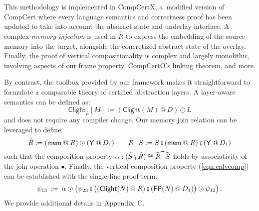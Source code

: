 \documentclass[acmsmall,screen,review,anonymous,nonacm]{acmart}
\newcommand{\kw}[1]{\ensuremath{ \mathsf{#1} }}
\newcommand{\jr}{\mathsf{Y}}
\newcommand{\vcomp}{\fatsemi}
\begin{document}
This methodology is implemented in CompCertX,
a~modified version of CompCert where
every language semantics and correctness proof
has been updated
to take into account the abstract state and underlay interface.
A complex \emph{memory injection} is used in $\hat{R}$
to express the embedding of the source memory into the target,
alongside the concretized abstract state of the overlay.
Finally, the proof of vertical compositionality
is complex and largely monolithic,
involving aspects of
our frame property,
CompCertO's linking theorem, and more.

By contrast,
the toolbox provided by our framework
makes it straightforward to formulate a comparable theory
of certified abstraction layers.
A layer-aware semantics can be defined as:
\[
  \kw{Clight}_L[M] := (\kw{Clight}(M) \mathbin@ D) \odot L
\]
and does not require any compiler change.
Our memory join relation can be leveraged to define:
\[
  \hat{R} := 
    (\kw{mem} \mathbin@ R) \odot (\jr \mathbin@ D_1)
  \qquad
  R \cdot S :=
    S \vcomp (\kw{mem} \mathbin@ R) \vcomp (\jr \mathbin@ D_1)
\]
such that the composition property
$\alpha : (\hat{S} \vcomp \hat{R}) \cong \widehat{R \cdot S}$
holds by associativity of the join operation $\bullet$.
Finally,
the vertical composition property (\ref{eqn:calvcomp})
can be established with the single-line proof term:
\[
  \psi_{13} \: := \:
    \alpha \odot \big(
    \psi_{23} \vcomp
    \big( (\kw{Clight}(N) \mathbin@ R) \vcomp
          (\kw{FP}(N) \mathbin@ D_1) \big) \odot \psi_{12} \big)
  \,.
\]
We provide additional details in Appendix~C. %
\end{document}

